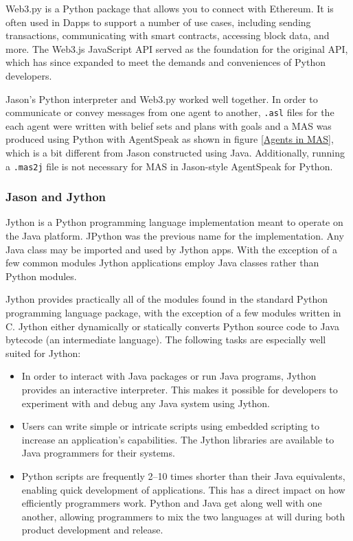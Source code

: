 Web3.py is a Python package that allows you to connect with Ethereum. It is often used in \ac{Dapp}s to support a number of use cases, including sending transactions, communicating with smart contracts, accessing block data, and more. The Web3.js JavaScript \ac{API} served as the foundation for the original \ac{API}, which has since expanded to meet the demands and conveniences of Python developers.

\vspace{.5cm}

Jason's Python interpreter and Web3.py worked well together. In order to communicate or convey messages from one agent to another, \texttt{.asl} files for the each agent were written with belief sets and plans with goals and a \ac{MAS} was produced using Python with AgentSpeak as shown in figure \ref{Agents in MAS}, which is a bit different from Jason constructed using Java. Additionally, running a \texttt{.mas2j} file is not necessary for \ac{MAS} in Jason-style AgentSpeak for Python.

\subsubsection{Jason and Jython}

Jython is a Python programming language implementation meant to operate on the Java platform. JPython was the previous name for the implementation. Any Java class may be imported and used by Jython apps. With the exception of a few common modules Jython applications employ Java classes rather than Python modules. 

\vspace{.5cm}
Jython provides practically all of the modules found in the standard Python programming language package, with the exception of a few modules written in C. Jython either dynamically or statically converts Python source code to Java bytecode (an intermediate language). The following tasks are especially well suited for Jython:

\begin{itemize}
    \item In order to interact with Java packages or run Java programs, Jython provides an interactive interpreter. This makes it possible for developers to experiment with and debug any Java system using Jython.
    \vspace{.5cm}
    \item Users can write simple or intricate scripts using embedded scripting to increase an application's capabilities. The Jython libraries are available to Java programmers for their systems.
    \vspace{.5cm}
     \item Python scripts are frequently 2–10 times shorter than their Java equivalents, enabling quick development of applications. This has a direct impact on how efficiently programmers work. Python and Java get along well with one another, allowing programmers to mix the two languages at will during both product development and release.
\end{itemize}

